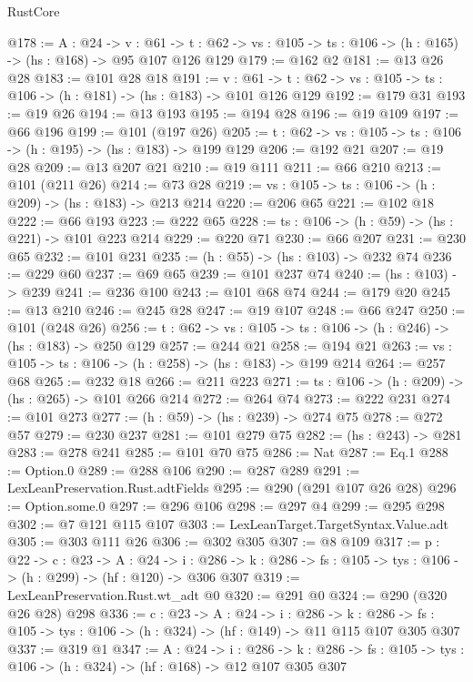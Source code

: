 \begin{lexlean}{RustCore}
\begin{coremodule}
@178 := {A : @24} ->
  {v : @61} ->
  {t : @62} -> {vs : @105} -> {ts : @106} -> (h : @165) -> (hs : @168) -> @95 @107 @126 @129
@179 := @162 @2
@181 := @13 @26 @28
@183 := @101 @28 @18
@191 := {v : @61} ->
  {t : @62} -> {vs : @105} -> {ts : @106} -> (h : @181) -> (hs : @183) -> @101 @126 @129
@192 := @179 @31
@193 := @19 @26
@194 := @13 @193
@195 := @194 @28
@196 := @19 @109
@197 := @66 @196
@199 := @101 (@197 @26)
@205 := {t : @62} -> {vs : @105} -> {ts : @106} -> (h : @195) -> (hs : @183) -> @199 @129
@206 := @192 @21
@207 := @19 @28
@209 := @13 @207 @21
@210 := @19 @111
@211 := @66 @210
@213 := @101 (@211 @26)
@214 := @73 @28
@219 := {vs : @105} -> {ts : @106} -> (h : @209) -> (hs : @183) -> @213 @214
@220 := @206 @65
@221 := @102 @18
@222 := @66 @193
@223 := @222 @65
@228 := {ts : @106} -> (h : @59) -> (hs : @221) -> @101 @223 @214
@229 := @220 @71
@230 := @66 @207
@231 := @230 @65
@232 := @101 @231
@235 := (h : @55) -> (hs : @103) -> @232 @74
@236 := @229 @60
@237 := @69 @65
@239 := @101 @237 @74
@240 := (hs : @103) -> @239
@241 := @236 @100
@243 := @101 @68 @74
@244 := @179 @20
@245 := @13 @210
@246 := @245 @28
@247 := @19 @107
@248 := @66 @247
@250 := @101 (@248 @26)
@256 := {t : @62} -> {vs : @105} -> {ts : @106} -> (h : @246) -> (hs : @183) -> @250 @129
@257 := @244 @21
@258 := @194 @21
@263 := {vs : @105} -> {ts : @106} -> (h : @258) -> (hs : @183) -> @199 @214
@264 := @257 @68
@265 := @232 @18
@266 := @211 @223
@271 := {ts : @106} -> (h : @209) -> (hs : @265) -> @101 @266 @214
@272 := @264 @74
@273 := @222 @231
@274 := @101 @273
@277 := (h : @59) -> (hs : @239) -> @274 @75
@278 := @272 @57
@279 := @230 @237
@281 := @101 @279 @75
@282 := (hs : @243) -> @281
@283 := @278 @241
@285 := @101 @70 @75
@286 := Nat
@287 := Eq.{1}
@288 := Option.{0}
@289 := @288 @106
@290 := @287 @289
@291 := LexLeanPreservation.Rust.adtFields
@295 := @290 (@291 @107 @26 @28)
@296 := Option.some.{0}
@297 := @296 @106
@298 := @297 @4
@299 := @295 @298
@302 := @7 @121 @115 @107
@303 := LexLeanTarget.TargetSyntax.Value.adt
@305 := @303 @111 @26
@306 := @302 @305
@307 := @8 @109
@317 := {p : @22} ->
  {c : @23} ->
  {A : @24} ->
  {i : @286} -> {k : @286} -> {fs : @105} -> {tys : @106} -> (h : @299) -> (hf : @120) -> @306 @307
@319 := LexLeanPreservation.Rust.wt_adt @0
@320 := @291 @0
@324 := @290 (@320 @26 @28) @298
@336 := {c : @23} ->
  {A : @24} ->
  {i : @286} ->
  {k : @286} -> {fs : @105} -> {tys : @106} -> (h : @324) -> (hf : @149) -> @11 @115 @107 @305 @307
@337 := @319 @1
@347 := {A : @24} ->
  {i : @286} ->
  {k : @286} -> {fs : @105} -> {tys : @106} -> (h : @324) -> (hf : @168) -> @12 @107 @305 @307

\end{coremodule}
\end{lexlean}
